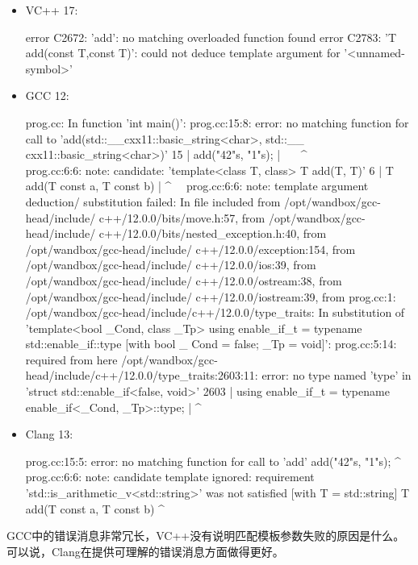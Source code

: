 \begin{itemize}
  \item VC++ 17:

\begin{shell}
error C2672: 'add': no matching overloaded function found
error C2783: 'T add(const T,const T)': could not deduce
template argument for '<unnamed-symbol>'
\end{shell}
  \item GCC 12:
\begin{shell}
prog.cc: In function 'int main()':
prog.cc:15:8: error: no matching function for call
to 'add(std::__cxx11::basic_string<char>, std::__
cxx11::basic_string<char>)'
15 |         add("42"s, "1"s);
   |       ~~~^~~~~~~~~~~~~
prog.cc:6:6: note: candidate: 'template<class T, class> T
add(T, T)'
6 | T add(T const a, T const b)
  |     ^~~
prog.cc:6:6: note: template argument deduction/
substitution failed:
In file included from /opt/wandbox/gcc-head/include/
c++/12.0.0/bits/move.h:57,
                 from /opt/wandbox/gcc-head/include/
c++/12.0.0/bits/nested_exception.h:40,
                 from /opt/wandbox/gcc-head/include/
c++/12.0.0/exception:154,
                 from /opt/wandbox/gcc-head/include/
c++/12.0.0/ios:39,
                 from /opt/wandbox/gcc-head/include/
c++/12.0.0/ostream:38,
                 from /opt/wandbox/gcc-head/include/
c++/12.0.0/iostream:39,
                 from prog.cc:1:
/opt/wandbox/gcc-head/include/c++/12.0.0/type_traits: In
substitution of 'template<bool _Cond, class _Tp> using
enable_if_t = typename std::enable_if::type [with bool _
Cond = false; _Tp = void]':
prog.cc:5:14: required from here
/opt/wandbox/gcc-head/include/c++/12.0.0/type_traits:2603:11:
error: no type named 'type' in 'struct std::enable_if<false, 
void>'
2603 | using enable_if_t = typename enable_if<_Cond, _Tp>::type;
     |            ^~~~~~~~~~~
\end{shell}
  \item Clang 13:
\begin{shell}
prog.cc:15:5: error: no matching function for call to
'add'
    add("42"s, "1"s);
    ^~~
prog.cc:6:6: note: candidate template ignored:
requirement 'std::is_arithmetic_v<std::string>' was not
satisfied [with T = std::string]
   T add(T const a, T const b)
      ^
\end{shell}
\end{itemize}

GCC中的错误消息非常冗长，VC++没有说明匹配模板参数失败的原因是什么。可以说，Clang在提供可理解的错误消息方面做得更好。

